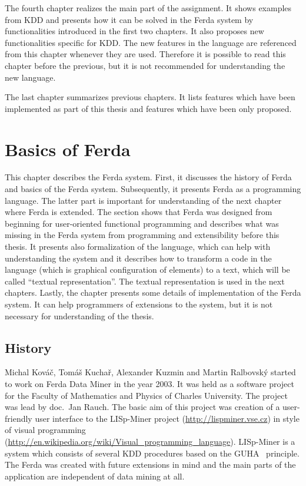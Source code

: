 \documentclass[a4paper,12pt]{book}
\begin{document}
The fourth chapter realizes the main part of the assignment. It shows examples from KDD and presents how it can be solved in the Ferda system by functionalities introduced in the first two chapters. It also proposes new functionalities specific for KDD. The new features in the language are referenced from this chapter whenever they are used. Therefore it is possible to read this chapter before the previous, but it is not recommended for understanding the new language.

The last chapter summarizes previous chapters. It lists features which have been implemented as part of this thesis and features which have been only proposed.

\chapter{Basics of Ferda}
This chapter describes the Ferda system. First, it discusses the history of Ferda and basics of the Ferda system. Subsequently, it presents Ferda as a programming language. The latter part is important for understanding of the next chapter where Ferda is extended. The section shows that Ferda was designed from beginning for user-oriented functional programming and describes what was missing in the Ferda system from programming and extensibility before this thesis. It presents also formalization of the language, which can help with understanding the system and it describes how to transform a code in the language (which is graphical configuration of elements) to a text, which will be called ``textual representation''. The textual representation is used in the next chapters. Lastly, the chapter presents some details of implementation of the Ferda system. It can help programmers of extensions to the system, but it is not necessary for understanding of the thesis. 

\section{History}
Michal Kováč, Tomáš Kuchař, Alexander Kuzmin and Martin Ralbovský started to work on Ferda Data Miner in the year 2003. It was held as a software project for the Faculty of Mathematics and Physics of Charles University. The project was lead by doc.~Jan Rauch. The basic aim of this project was creation of a user-friendly user interface to the LISp-Miner project (\url{http://lispminer.vse.cz}) in style of visual programming (\url{http://en.wikipedia.org/wiki/Visual\_programming\_language}). LISp-Miner is a system which consists of several KDD procedures based on the GUHA~\cite{GUHAbook} principle. The Ferda was created with future extensions in mind and the main parts of the application are independent of data mining at all.
\end{document}
